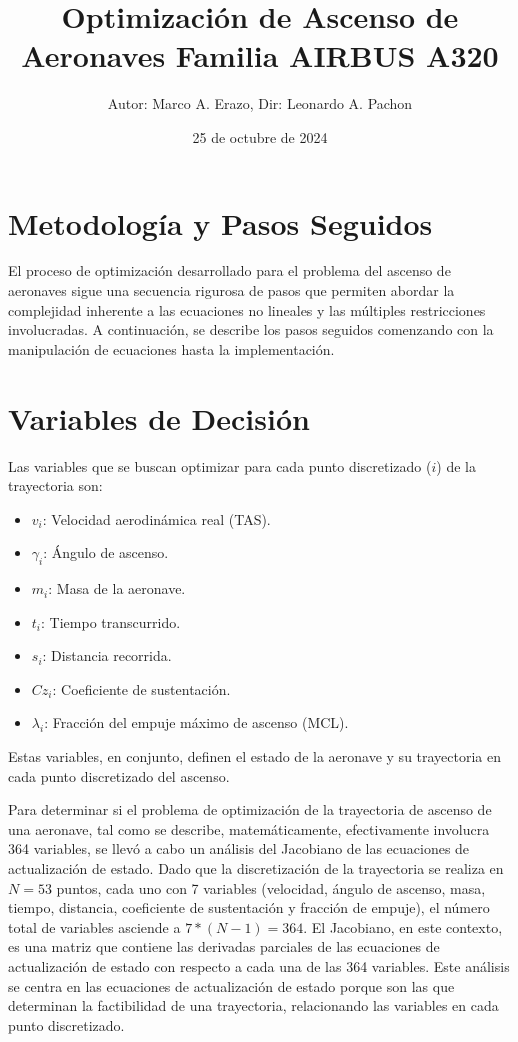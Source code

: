\documentclass[fleqn]{article}
\begin{document}
\title{Optimización de Ascenso de Aeronaves Familia AIRBUS A320}
\author{Autor: Marco A. Erazo, Dir: Leonardo A. Pachon}
\date{25 de octubre de 2024}
\maketitle
\tableofcontents

\section*{Metodología y Pasos Seguidos}

El proceso de optimización desarrollado para el problema del ascenso de aeronaves sigue una secuencia rigurosa de pasos que permiten abordar la complejidad inherente a las ecuaciones no lineales y las múltiples restricciones involucradas. A continuación, se describe los pasos seguidos comenzando con la manipulación de ecuaciones hasta la implementación.

\section{Variables de Decisión}

Las variables que se buscan optimizar para cada punto discretizado ($i$) de la trayectoria son:

\begin{itemize}
    \item \textbf{$v_i$}: Velocidad aerodinámica real (TAS).
    \item \textbf{$\gamma_i$}: Ángulo de ascenso.
    \item \textbf{$m_i$}: Masa de la aeronave.
    \item \textbf{$t_i$}: Tiempo transcurrido.
    \item \textbf{$s_i$}: Distancia recorrida.
    \item \textbf{$Cz_i$}: Coeficiente de sustentación.
    \item \textbf{$\lambda_i$}: Fracción del empuje máximo de ascenso (MCL).
\end{itemize}

Estas variables, en conjunto, definen el estado de la aeronave y su trayectoria en cada punto discretizado del ascenso.

Para determinar si el problema de optimización de la trayectoria de ascenso de una aeronave, tal como se describe, matemáticamente, efectivamente involucra 364 variables, se llevó a cabo un análisis del Jacobiano de las ecuaciones de actualización de estado. Dado que la discretización de la trayectoria se realiza en $N=53$ puntos, cada uno con 7 variables (velocidad, ángulo de ascenso, masa, tiempo, distancia, coeficiente de sustentación y fracción de empuje), el número total de variables asciende a $7*(N-1) = 364$. El Jacobiano, en este contexto, es una matriz que contiene las derivadas parciales de las ecuaciones de actualización de estado con respecto a cada una de las 364 variables. Este análisis se centra en las ecuaciones de actualización de estado porque son las que determinan la factibilidad de una trayectoria, relacionando las variables en cada punto discretizado.
\end{document}
